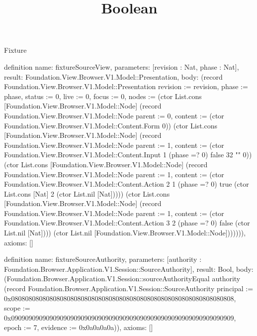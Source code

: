 \begin{lexlean}{Fixture}
\title{Boolean}
\begin{semanticmodule}
definition{
  name: fixtureSourceView,
  parameters: [revision : Nat, phase : Nat],
  result: Foundation.View.Browser.V1.Model::Presentation,
  body: (record Foundation.View.Browser.V1.Model::Presentation {revision := revision, phase := phase, status := 0, live := 0, focus := 0, nodes := (ctor List.cons [Foundation.View.Browser.V1.Model::Node] (record Foundation.View.Browser.V1.Model::Node {parent := 0, content := (ctor Foundation.View.Browser.V1.Model::Content.Form 0)}) (ctor List.cons [Foundation.View.Browser.V1.Model::Node] (record Foundation.View.Browser.V1.Model::Node {parent := 1, content := (ctor Foundation.View.Browser.V1.Model::Content.Input 1 (phase =? 0) false 32 "" 0)}) (ctor List.cons [Foundation.View.Browser.V1.Model::Node] (record Foundation.View.Browser.V1.Model::Node {parent := 1, content := (ctor Foundation.View.Browser.V1.Model::Content.Action 2 1 (phase =? 0) true (ctor List.cons [Nat] 2 (ctor List.nil [Nat])))}) (ctor List.cons [Foundation.View.Browser.V1.Model::Node] (record Foundation.View.Browser.V1.Model::Node {parent := 1, content := (ctor Foundation.View.Browser.V1.Model::Content.Action 3 2 (phase =? 0) false (ctor List.nil [Nat]))}) (ctor List.nil [Foundation.View.Browser.V1.Model::Node])))))}),
  axioms: []
}

definition{
  name: fixtureSourceAuthority,
  parameters: [authority : Foundation.Browser.Application.V1.Session::SourceAuthority],
  result: Bool,
  body: (Foundation.Browser.Application.V1.Session::sourceAuthorityEqual authority (record Foundation.Browser.Application.V1.Session::SourceAuthority {principal := 0x0808080808080808080808080808080808080808080808080808080808080808, scope := 0x0909090909090909090909090909090909090909090909090909090909090909, epoch := 7, evidence := 0x0a0a0a0a})),
  axioms: []
}


\end{semanticmodule}
\end{lexlean}
